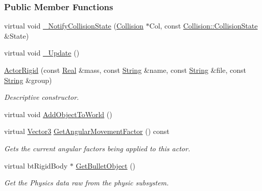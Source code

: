 \subsubsection*{Public Member Functions}
\begin{DoxyCompactItemize}
\item 
virtual void \hyperlink{classMezzanine_1_1ActorRigid_a68827280395bc3b9e0266710ec44247d}{\_\-NotifyCollisionState} (\hyperlink{classMezzanine_1_1Collision}{Collision} $\ast$Col, const \hyperlink{classMezzanine_1_1Collision_a24094c597061743dcd571f36077f4d19}{Collision::CollisionState} \&State)
\item 
virtual void \hyperlink{classMezzanine_1_1ActorRigid_a714d836a18ddb4de65bec5afdfdbb81c}{\_\-Update} ()
\item 
\hyperlink{classMezzanine_1_1ActorRigid_a3afd611b08d805b9f3261ede834f6709}{ActorRigid} (const \hyperlink{namespaceMezzanine_a726731b1a7df72bf3583e4a97282c6f6}{Real} \&mass, const \hyperlink{namespaceMezzanine_acf9fcc130e6ebf08e3d8491aebcf1c86}{String} \&name, const \hyperlink{namespaceMezzanine_acf9fcc130e6ebf08e3d8491aebcf1c86}{String} \&file, const \hyperlink{namespaceMezzanine_acf9fcc130e6ebf08e3d8491aebcf1c86}{String} \&group)
\begin{DoxyCompactList}\small\item\em Descriptive constructor. \item\end{DoxyCompactList}\item 
virtual void \hyperlink{classMezzanine_1_1ActorRigid_acb6027d5447427d1199b7b9e6ccaaad4}{AddObjectToWorld} ()
\item 
virtual \hyperlink{classMezzanine_1_1Vector3}{Vector3} \hyperlink{classMezzanine_1_1ActorRigid_ac2b338b867bfd7d2e322a834e308a957}{GetAngularMovementFactor} () const 
\begin{DoxyCompactList}\small\item\em Gets the current angular factors being applied to this actor. \item\end{DoxyCompactList}\item 
virtual btRigidBody $\ast$ \hyperlink{classMezzanine_1_1ActorRigid_aec84029880e2cebf3cc154ada813a372}{GetBulletObject} ()
\begin{DoxyCompactList}\small\item\em Get the Physics data raw from the physic subsystem. \item\end{DoxyCompactList}\item 

\end{DoxyCompactItemize}

